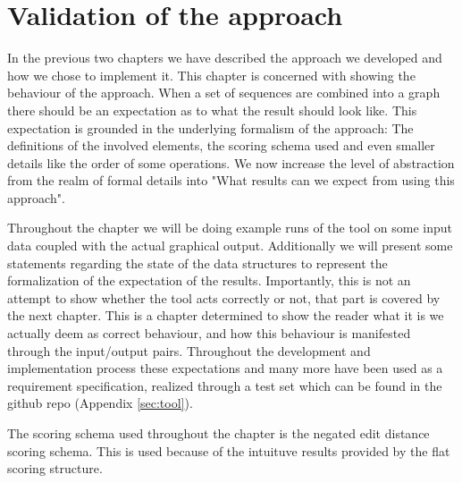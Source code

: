 \documentclass[thesis.tex]{subfiles}
\begin{document}
\chapter{Validation of the approach}
\label{sec:validation}
In the previous two chapters we have described the approach we developed and how we chose to implement it. This chapter is concerned with showing the behaviour of the approach. When a set of sequences are combined into a graph there should be an expectation as to what the result should look like. This expectation is grounded in the underlying formalism of the approach: The definitions of the involved elements, the scoring schema used and even smaller details like the order of some operations. We now increase the level of abstraction from the realm of formal details into "What results can we expect from using this approach".\\
\par\noindent
Throughout the chapter we will be doing example runs of the tool on some input data coupled with the actual graphical output. Additionally we will present some statements regarding the state of the data structures to represent the formalization of the expectation of the results. Importantly, this is not an attempt to show whether the tool acts correctly or not, that part is covered by the next chapter. This is a chapter determined to show the reader what it is we actually deem as correct behaviour, and how this behaviour is manifested through the input/output pairs. Throughout the development and implementation process these expectations and many more have been used as a requirement specification, realized through a test set which can be found in the github repo (Appendix \ref{sec:tool}).\\
\par\noindent
The scoring schema used throughout the chapter is the negated edit distance scoring schema. This is used because of the intuituve results provided by the flat scoring structure. 
\end{document}
